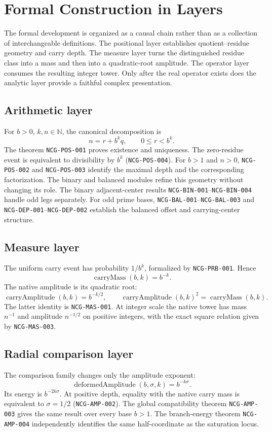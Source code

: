 \documentclass[11pt,a4paper]{article}
\newcommand{\carryMass}{\operatorname{carryMass}}
\newcommand{\carryAmp}{\operatorname{carryAmplitude}}
\newcommand{\radialAmp}{\operatorname{deformedAmplitude}}
\begin{document}
\section{Formal Construction in Layers}
The formal development is organized as a causal chain rather than as a collection of interchangeable definitions. The positional layer establishes quotient--residue geometry and carry depth. The measure layer turns the distinguished residue class into a mass and then into a quadratic-root amplitude. The operator layer consumes the resulting integer tower. Only after the real operator exists does the analytic layer provide a faithful complex presentation.
\subsection{Arithmetic layer}
For $b>0$, $k,n\in\mathbb N$, the canonical decomposition is
\[ n=r+b^kq,\qquad 0\le r<b^k. \]
The theorem \texttt{NCG-POS-001} proves existence and uniqueness. The zero-residue event is equivalent to divisibility by $b^k$ (\texttt{NCG-POS-004}). For $b>1$ and $n>0$, \texttt{NCG-POS-002} and \texttt{NCG-POS-003} identify the maximal depth and the corresponding factorization.
The binary and balanced modules refine this geometry without changing its role. The binary adjacent-center results \texttt{NCG-BIN-001}--\texttt{NCG-BIN-004} handle odd legs separately. For odd prime bases, \texttt{NCG-BAL-001}--\texttt{NCG-BAL-003} and \texttt{NCG-DEP-001}--\texttt{NCG-DEP-002} establish the balanced offset and carrying-center structure.
\subsection{Measure layer}
The uniform carry event has probability $1/b^k$, formalized by \texttt{NCG-PRB-001}. Hence
\[ \carryMass(b,k)=b^{-k}. \]
The native amplitude is its quadratic root:
\[ \carryAmp(b,k)=b^{-k/2},\qquad \carryAmp(b,k)^2=\carryMass(b,k). \]
The latter identity is \texttt{NCG-MAS-001}. At integer scale the native tower has mass $n^{-1}$ and amplitude $n^{-1/2}$ on positive integers, with the exact square relation given by \texttt{NCG-MAS-003}.
\subsection{Radial comparison layer}
The comparison family changes only the amplitude exponent:
\[ \radialAmp(b,\sigma,k)=b^{-k\sigma}. \]
Its energy is $b^{-2k\sigma}$. At positive depth, equality with the native carry mass is equivalent to $\sigma=1/2$ (\texttt{NCG-AMP-002}). The global compatibility theorem \texttt{NCG-AMP-003} gives the same result over every base $b>1$. The branch-energy theorem \texttt{NCG-AMP-004} independently identifies the same half-coordinate as the saturation locus.
\end{document}

